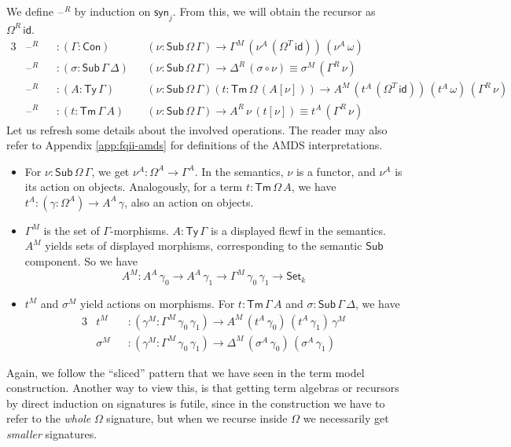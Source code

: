 \documentclass[12pt,a4paper,twoside,openany]{book}
\theoremstyle{remark}
\theoremstyle{definition}
\theoremstyle{theorem}
\newcommand{\id}{\mathsf{id}}
\newcommand{\Con}{\mathsf{Con}}
\newcommand{\Sub}{\mathsf{Sub}}
\newcommand{\Tm}{\mathsf{Tm}}
\newcommand{\Ty}{\mathsf{Ty}}
\newcommand{\blank}{\mathord{\hspace{1pt}\text{--}\hspace{1pt}}}
\newcommand{\Set}{\mathsf{Set}}
\newcommand{\syn}{\mathsf{syn}}
\begin{document}
We define $\blank^R$ by induction on $\syn_j$. From this, we will obtain the
recursor as $\Omega^R\,\id$.
\begin{alignat*}{3}
  &\blank^R &&: (\Gamma : \Con)&&(\nu : \Sub\,\Omega\,\Gamma) \to \Gamma^M\,(\nu^A\,(\Omega^T\,\id))\,(\nu^A\,\omega)\\
  &\blank^R &&: (\sigma : \Sub\,\Gamma\,\Delta)&&(\nu : \Sub\,\Omega\,\Gamma) \to \Delta^R\,(\sigma \circ \nu) \equiv \sigma^M\,(\Gamma^R\,\nu)\\
  &\blank^R &&: (A : \Ty\,\Gamma)&&(\nu : \Sub\,\Omega\,\Gamma)(t : \Tm\,\Omega\,(A[\nu]))
     \to A^M\,(t^A\,(\Omega^T\,\id))\,(t^A\,\omega)\,(\Gamma^R\,\nu)\\
  &\blank^R &&: (t : \Tm\,\Gamma\,A)&&(\nu : \Sub\,\Omega\,\Gamma) \to A^R\,\nu\,(t[\nu]) \equiv t^A\,(\Gamma^R\,\nu)
\end{alignat*}
Let us refresh some details about the involved operations. The reader may also
refer to Appendix \ref{app:fqii-amds} for definitions of the AMDS
interpretations.
\begin{itemize}
\item
  For $\nu : \Sub\,\Omega\,\Gamma$, we get $\nu^A : \Omega^A \to \Gamma^A$. In
  the semantics, $\nu$ is a functor, and $\nu^A$ is its action on
  objects. Analogously, for a term $t : \Tm\,\Omega\,A$, we have $t^A : (\gamma
  : \Omega^A) \to A^A\,\gamma$, also an action on objects.
\item
  $\Gamma^M$ is the set of $\Gamma$-morphisms. $A : \Ty\,\Gamma$ is a displayed
  flcwf in the semantics. $A^M$ yields sets of displayed morphisms,
  corresponding to the semantic $\Sub$ component. So we have
  \[ A^M : A^A\,\gamma_0 \to A^A\,\gamma_1 \to \Gamma^M\,\gamma_0\,\gamma_1 \to \Set_{k} \]
\item $t^M$ and $\sigma^M$ yield actions on morphisms. For $t : \Tm\,\Gamma\,A$ and $\sigma : \Sub\,\Gamma\,\Delta$, we have
  \begin{alignat*}{3}
    &t^M      &&: (\gamma^M : \Gamma^M\,\gamma_0\,\gamma_1) \to A^M\,(t^A\,\gamma_0)\,(t^A\,\gamma_1)\,\gamma^M\\
    &\sigma^M &&: (\gamma^M : \Gamma^M\,\gamma_0\,\gamma_1) \to \Delta^M\,(\sigma^A\,\gamma_0)\,(\sigma^A\,\gamma_1)
  \end{alignat*}
\end{itemize}

Again, we follow the ``sliced'' pattern that we have seen in the term model
construction. Another way to view this, is that getting term algebras or
recursors by direct induction on signatures is futile, since in the
construction we have to refer to the \emph{whole} $\Omega$ signature, but when
we recurse inside $\Omega$ we necessarily get \emph{smaller} signatures.
\end{document}
